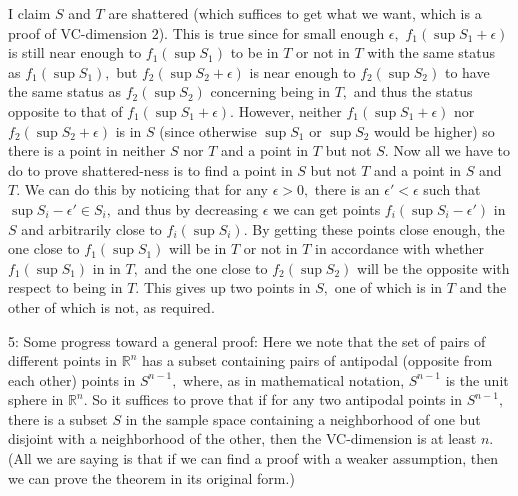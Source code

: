 \documentclass{article}
\begin{document}
I claim $S$ and $T$ are shattered (which suffices to get what we want, which is a proof of VC-dimension $2$). This is true since for small enough $\epsilon,$ $f_1(\sup S_1 + \epsilon)$ is still near enough to $f_1(\sup S_1)$ to be in $T$ or not in $T$ with the same status as $f_1(\sup S_1),$ but $f_2(\sup S_2 + \epsilon)$ is near enough to $f_2(\sup S_2)$ to have the same status as $f_2(\sup S_2)$  concerning being in $T,$ and thus the status opposite to that of $f_1(\sup S_1 + \epsilon).$ However, neither $f_1(\sup S_1 + \epsilon)$ nor $f_2(\sup S_2 + \epsilon)$ is in $S$ (since otherwise $\sup S_1$ or $\sup S_2$ would be higher) so there is a point in neither $S$ nor $T$ and a point in $T$ but not $S.$ Now all we have to do to prove shattered-ness is to find a point in $S$ but not $T$ and a point in $S$ and $T.$ We can do this by noticing that for any $\epsilon > 0,$ there is an $\epsilon' < \epsilon$ such that $\sup S_i - \epsilon' \in S_i,$ and thus by decreasing $\epsilon$ we can get points $f_i(\sup S_i - \epsilon')$ in $S$ and arbitrarily close to $f_i(\sup S_i).$ By getting these points close enough, the one close to $f_1(\sup S_1)$ will be in $T$ or not in $T$ in accordance with whether $f_1(\sup S_1)$ in in $T,$ and the one close to $f_2(\sup S_2)$ will be the opposite with respect to being in $T.$ This gives up two points in $S,$ one of which is in $T$ and the other of which is not, as required.

5: Some progress toward a general proof:
Here we note that the set of pairs of different points in $\mathbb{R}^n$ has a subset containing pairs of antipodal (opposite from each other) points in $S^{n - 1},$ where, as in mathematical notation, $S^{n - 1}$ is the unit sphere in $\mathbb{R}^n.$ So it suffices to prove that if for any two antipodal points in $S^{n - 1},$ there is a subset $S$ in the sample space containing a neighborhood of one but disjoint with a neighborhood of the other, then the VC-dimension is at least $n.$ (All we are saying is that if we can find a proof with a weaker assumption, then we can prove the theorem in its original form.)
\end{document}
